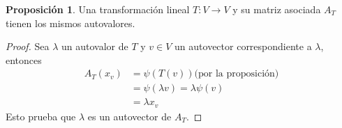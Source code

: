 \documentclass[10pt,a4paper]{article}
\theoremstyle{definition}
\newtheorem{proposition}{Proposición}[section]
\begin{document}
\begin{proposition}
    Una transformación lineal $T: V \rightarrow V$ y su matriz asociada $A_{T}$ tienen  los mismos autovalores.
\end{proposition}

\begin{proof}
Sea $\lambda$ un autovalor de $T$ y $v\in V$ un autovector correspondiente a $\lambda$, entonces
\begin{align*}
A_{T}(x_{v})&= \psi(T(v))  \text{(por la proposición)}\\
						& = \psi(\lambda v) = \lambda \psi(v)\\
						& = \lambda x_{v}
\end{align*}
Esto prueba que $\lambda$ es un autovector de $A_{T}$.
\end{proof}
\end{document}
